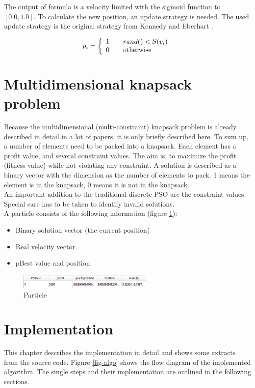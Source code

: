 \documentclass{article}
\begin{document}
The output of formula is a velocity limited with the sigmoid function to $[0.0, 1.0]$. To calculate the new position, an update strategy is needed. The used update strategy is the original strategy from Kennedy and Eberhart \cite{bib-discrete}.

\begin{equation}
p_i = \left\{ 
\begin{array}{l l}
  1 & \quad \text{$rand() < S(v_i)$}\\
  0 & \quad \text{otherwise}
\end{array} \right.
\end{equation}


\section{Multidimensional knapsack problem}
\label{lbl-mknap}
Because the multidimensional (multi-constraint) knapsack problem is already described in detail in a lot of papers, it is only briefly described here. To sum up, a number of elements need to be packed into a knapsack. Each element has a profit value, and several constraint values. The aim is, to maximize the profit (fitness value) while not violating any constraint. A solution is described as a binary vector with the dimension as the number of elements to pack. 1 means the element is in the knapsack, 0 means it is not in the knapsack. \\ An important addition to the traditional discrete PSO are the constraint values. Special care has to be taken to identify invalid solutions.\\

A particle consists of the following information (figure \ref{fig-particle}):
\begin{itemize}
\item Binary solution vector (the current position)
\item Real velocity vector
\item pBest value and position
\end{itemize}

\begin{figure}[H]
    \centering
    \includegraphics[width=250px]{images/particle.PNG}
    \caption{Particle}
    \label{fig-particle}
\end{figure}

\section{Implementation}
\label{lbl-impl}
This chapter describes the implementation in detail and shows some extracts from the source code. Figure \ref{fig-algo} shows the flow diagram of the implemented algorithm. The single steps and their implementation are outlined in the following sections.
\end{document}
